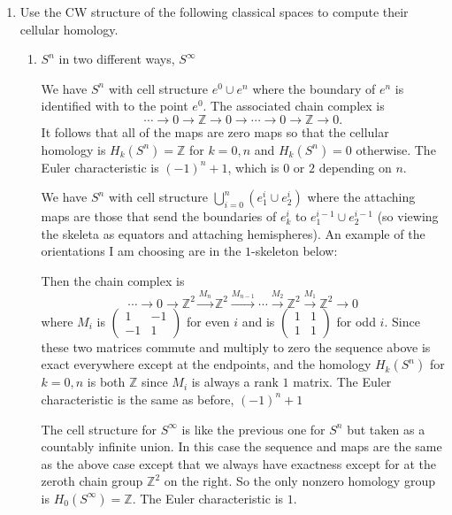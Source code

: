 \documentclass[11pt]{article}
\begin{document}
\begin{enumerate}
    \item Use the CW structure of the following classical spaces to compute their cellular homology.\begin{enumerate}
        \item $S^n$ in two different ways, $S^\infty$
        
        We have $S^n$ with cell structure $e^0\cup e^n$ where the boundary of $e^n$ is identified with to the point $e^0$. The associated chain complex is \[\cdots \to 0\to \mathbb{Z}\to 0\to\cdots\to 0 \to \mathbb{Z}\to 0.\] It follows that all of the maps are zero maps so that the cellular homology is $H_k(S^n) = \mathbb{Z}$ for $k = 0,n$ and $H_k(S^n) = 0$ otherwise. The Euler characteristic is $(-1)^n + 1$, which is $0$ or $2$ depending on $n$.

        We have $S^n$ with cell structure $\bigcup_{i=0}^n (e^i_1\cup e^i_2)$ where the attaching maps are those that send the boundaries of $e^i_k$ to $e^{i-1}_1\cup e^{i-1}_2$ (so viewing the skeleta as equators and attaching hemispheres). An example of the orientations I am choosing are in the $1$-skeleton below:\vspace*{5cm}

        Then the chain complex is \[\cdots\to 0 \to \mathbb{Z}^2\xrightarrow{M_n}\mathbb{Z}^2\xrightarrow{M_{n-1}}\cdots\xrightarrow{M_2}\mathbb{Z}^2\xrightarrow{M_1}\mathbb{Z}^2\to 0\] where $M_i$ is $\begin{pmatrix}
            1 & -1 \\ -1 & 1
        \end{pmatrix}$ for even $i$ and is $\begin{pmatrix}
            1 & 1 \\ 1 & 1
        \end{pmatrix}$ for odd $i$. Since these two matrices commute and multiply to zero the sequence above is exact everywhere except at the endpoints, and the homology $H_k(S^n)$ for $k = 0,n$ is both $\mathbb{Z}$ since $M_i$ is always a rank $1$ matrix. The Euler characteristic is the same as before, $(-1)^n+1$

        The cell structure for $S^\infty$ is like the previous one for $S^n$ but taken as a countably infinite union. In this case the sequence and maps are the same as the above case except that we always have exactness except for at the zeroth chain group $\mathbb{Z}^2$ on the right. So the only nonzero homology group is $H_0(S^\infty) = \mathbb{Z}$. The Euler characteristic is $1$.


\end{enumerate}
\end{enumerate}
\end{document}
